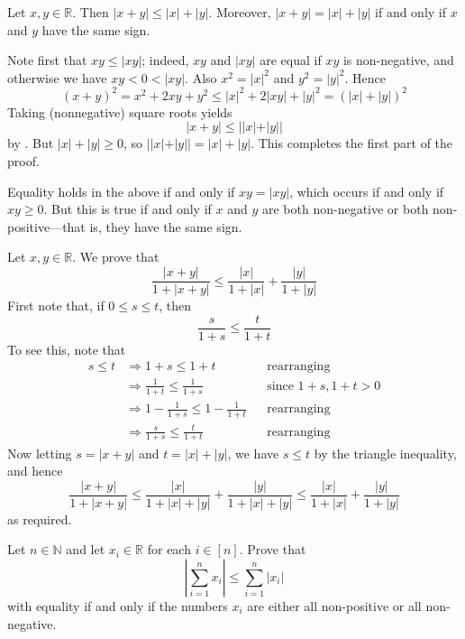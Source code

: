 \begin{theorem}
\label{thmTriangleInequality1D}
Let $x,y \in \mathbb{R}$. Then $|x+y| \le |x|+|y|$. Moreover, $|x+y|=|x|+|y|$ if and only if $x$ and $y$ have the same sign.
\end{theorem}
\begin{cproof}
Note first that $xy \le |xy|$; indeed, $xy$ and $|xy|$ are equal if $xy$ is non-negative, and otherwise we have $xy < 0 < |xy|$. Also $x^2=|x|^2$ and $y^2=|y|^2$. Hence
\[ (x+y)^2 = x^2+2xy+y^2 \le |x|^2+2|xy|+|y|^2 = (|x|+|y|)^2 \]
Taking (nonnegative) square roots yields
\[ |x+y| \le ||x|+|y|| \]
by . But $|x|+|y| \ge 0$, so $||x|+|y||=|x|+|y|$. This completes the first part of the proof.

Equality holds in the above if and only if $xy=|xy|$, which occurs if and only if $xy \ge 0$. But this is true if and only if $x$ and $y$ are both non-negative or both non-positive---that is, they have the same sign.
\end{cproof}

\begin{example}
Let $x,y \in \mathbb{R}$. We prove that
\[ \frac{|x+y|}{1+|x+y|} \le \frac{|x|}{1+|x|} + \frac{|y|}{1+|y|} \]
First note that, if $0 \le s \le t$, then
\[ \frac{s}{1+s} \le \frac{t}{1+t} \]
To see this, note that
\begin{align*}
s \le t &\Rightarrow 1+s \le 1+t && \text{rearranging} \\
&\Rightarrow \frac{1}{1+t} \le \frac{1}{1+s} && \text{since $1+s,1+t > 0$} \\
&\Rightarrow 1-\frac{1}{1+s} \le 1-\frac{1}{1+t} && \text{rearranging} \\
&\Rightarrow \frac{s}{1+s} \le \frac{t}{1+t} && \text{rearranging}
\end{align*}
Now letting $s=|x+y|$ and $t=|x|+|y|$, we have $s \le t$ by the triangle inequality, and hence
\[ \frac{|x+y|}{1+|x+y|} \le \frac{|x|}{{1+|x|+|y|}} + \frac{|y|}{1+|x|+|y|} \le \frac{|x|}{1+|x|} + \frac{|y|}{1+|y|} \]
as required.
\end{example}

\begin{exercise}
Let $n \in \mathbb{N}$ and let $x_i \in \mathbb{R}$ for each $i \in [n]$. Prove that
\[ \left| \sum_{i=1}^n x_i \right| \le \sum_{i=1}^n |x_i| \]
with equality if and only if the numbers $x_i$ are either all non-positive or all non-negative.
\end{exercise}

